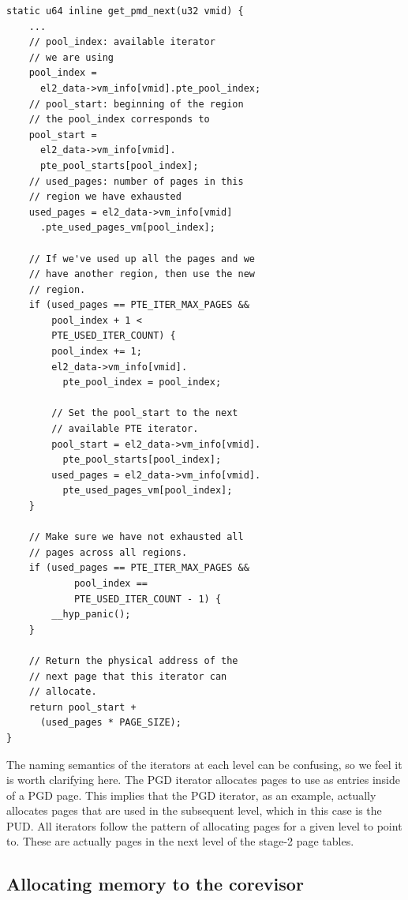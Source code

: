 \begin{verbatim}
static u64 inline get_pmd_next(u32 vmid) {
    ...
    // pool_index: available iterator
    // we are using
    pool_index =
      el2_data->vm_info[vmid].pte_pool_index;
    // pool_start: beginning of the region
    // the pool_index corresponds to
    pool_start =
      el2_data->vm_info[vmid].
      pte_pool_starts[pool_index];
    // used_pages: number of pages in this
    // region we have exhausted
    used_pages = el2_data->vm_info[vmid]
      .pte_used_pages_vm[pool_index];

    // If we've used up all the pages and we
    // have another region, then use the new
    // region.
    if (used_pages == PTE_ITER_MAX_PAGES &&
        pool_index + 1 <
        PTE_USED_ITER_COUNT) {
        pool_index += 1;
        el2_data->vm_info[vmid].
          pte_pool_index = pool_index;

        // Set the pool_start to the next
        // available PTE iterator.
        pool_start = el2_data->vm_info[vmid].
          pte_pool_starts[pool_index];
        used_pages = el2_data->vm_info[vmid].
          pte_used_pages_vm[pool_index];
    }

    // Make sure we have not exhausted all
    // pages across all regions.
    if (used_pages == PTE_ITER_MAX_PAGES &&
            pool_index ==
            PTE_USED_ITER_COUNT - 1) {
        __hyp_panic();
    }

    // Return the physical address of the
    // next page that this iterator can
    // allocate.
    return pool_start +
      (used_pages * PAGE_SIZE);
}
\end{verbatim}

The naming semantics of the iterators at each level can be confusing, so we feel it is worth
clarifying here. The PGD iterator allocates pages to use as entries inside of a PGD page. This
implies that the PGD iterator, as an example, actually allocates pages that are used in the
subsequent level, which in this case is the PUD. All iterators follow the pattern of allocating
pages for a given level to point to. These are actually pages in the next level
of the stage-2 page tables.

\subsection{Allocating memory to the corevisor}

